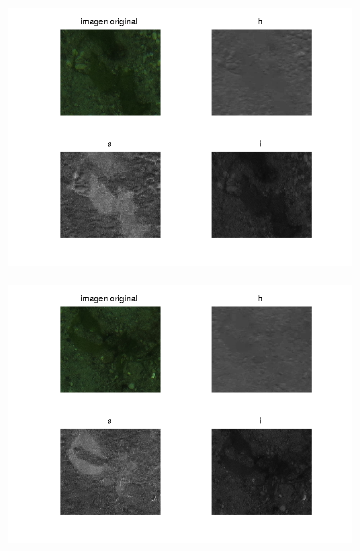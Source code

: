 \documentclass{article}
\begin{document}
\begin{figure}[H]
\begin{subfigure}{0.5\textwidth}
    \end{subfigure}\hfill
	\begin{subfigure}{0.5\textwidth}
	\centering
        \includegraphics[scale=0.6]{im6.png}
    \end{subfigure}\hfill
	\begin{subfigure}{0.5\textwidth}
	\centering
        \includegraphics[scale=0.6]{im7.png}
    \end{subfigure}\hfill
	\begin{subfigure}{0.5\textwidth}
	\centering

\end{subfigure}
\end{figure}
\end{document}
